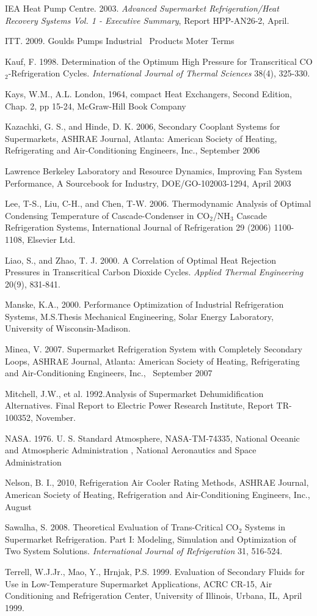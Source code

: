 IEA Heat Pump Centre. 2003. \emph{Advanced Supermarket Refrigeration/Heat Recovery Systems Vol. 1 - Executive Summary}, Report HPP-AN26-2, April.

ITT. 2009. Goulds Pumps Industrial~ Products Moter Terms

Kauf, F. 1998. Determination of the Optimum High Pressure for Transcritical CO\(_{2}\)-Refrigeration Cycles. \emph{International Journal of Thermal Sciences} 38(4), 325-330.

Kays, W.M., A.L. London, 1964, compact Heat Exchangers, Second Edition, Chap. 2, pp 15-24, McGraw-Hill Book Company

Kazachki, G. S., and Hinde, D. K. 2006, Secondary Cooplant Systems for Supermarkets, ASHRAE Journal, Atlanta: American Society of Heating, Refrigerating and Air-Conditioning Engineers, Inc., September 2006

Lawrence Berkeley Laboratory and Resource Dynamics, Improving Fan System Performance, A Sourcebook for Industry, DOE/GO-102003-1294, April 2003

Lee, T-S., Liu, C-H., and Chen, T-W. 2006. Thermodynamic Analysis of Optimal Condensing Temperature of Cascade-Condenser in CO\(_{2}\)/NH\(_{3}\) Cascade Refrigeration Systems, International Journal of Refrigeration 29 (2006) 1100-1108, Elsevier Ltd.

Liao, S., and Zhao, T. J. 2000. A Correlation of Optimal Heat Rejection Pressures in Transcritical Carbon Dioxide Cycles. \emph{Applied Thermal Engineering} 20(9), 831-841.

Manske, K.A., 2000. Performance Optimization of Industrial Refrigeration Systems, M.S.Thesis Mechanical Engineering, Solar Energy Laboratory, University of Wisconsin-Madison.

Minea, V. 2007. Supermarket Refrigeration System with Completely Secondary Loops, ASHRAE Journal, Atlanta: American Society of Heating, Refrigerating and Air-Conditioning Engineers, Inc., ~September 2007

Mitchell, J.W., et al. 1992.Analysis of Supermarket Dehumidification Alternatives. Final Report to Electric Power Research Institute, Report TR-100352, November.

NASA. 1976. U. S. Standard Atmosphere, NASA-TM-74335, National Oceanic and Atmospheric Administration , National Aeronautics and Space Administration

Nelson, B. I., 2010, Refrigeration Air Cooler Rating Methods, ASHRAE Journal, American Society of Heating, Refrigeration and Air-Conditioning Engineers, Inc., August

Sawalha, S. 2008. Theoretical Evaluation of Trans-Critical CO\(_{2}\) Systems in Supermarket Refrigeration. Part I: Modeling, Simulation and Optimization of Two System Solutions. \emph{International Journal of Refrigeration} 31, 516-524.

Terrell, W.J.Jr., Mao, Y., Hrnjak, P.S. 1999. Evaluation of Secondary Fluids for Use in Low-Temperature Supermarket Applications, ACRC CR-15, Air Conditioning and Refrigeration Center, University of Illinois, Urbana, IL, April 1999.
